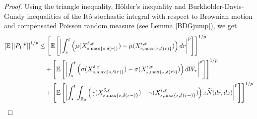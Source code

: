 \documentclass[11pt]{article}
\theoremstyle{theorem}
\theoremstyle{definition}
\newcommand{\bR}{\mathbb{R}}
\newcommand{\1}{{\bf 1}}
\begin{document}
\begin{proof}
Using the triangle inequality, H\"older's inequality and Burkholder-Davis-Gundy inequalities of the It\^o stochastic integral with respect to Brownian motion and compensated Poisson random measure (see Lemma \ref{BDGjump}), we get
\begin{align}
\left[\mathbb{E}\left[\left|P_1\right|^p\right]\right]^{1/p} 
 & \le \left[\mathbb{E}\left[\left|\int_s^t \left( \mu(X_{s,\max\{s,\delta(r)\}}^{\delta,x}) - \mu(X_{s,\max\{s,\delta(r)\}}^{\iota,x}) \right) dr\right|^p\right]\right]^{1/p} \notag \\
 & \quad + \left[\mathbb{E}\left[\left| \int_s^t \left( \sigma(X_{s,\max\{s,\delta(r)\}}^{\delta,x}) - \sigma(X_{s,\max\{s,\delta(r)\}}^{\iota,x}) \right) dW_r \right|^p\right]\right]^{1/p} \notag \\
   & \quad +\left[\mathbb{E}\left[\left| \int_s^t \int_{\bR_0} \left(\gamma (X_{s,\max\{s,\delta(r-)\}}^{\delta,x})-\gamma (X_{s,\max\{s,\delta(r-)\}}^{\iota,x})\right) z \widetilde{N}(dr, dz)\right|^p\right]\right]^{1/p}\notag \\ 

\end{align}
\end{proof}
\end{document}
